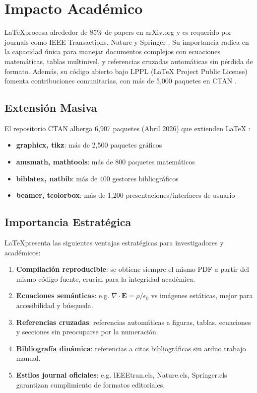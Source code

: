 \section{Impacto Académico}
\LaTeX procesa alrededor de 85\% de papers en arXiv.org y es requerido por journals como IEEE Transactions, Nature y Springer \cite{ieee_requirements,arxiv_stats}. Su importancia radica en la capacidad única para manejar documentos complejos con ecuaciones matemáticas, tablas multinivel, y referencias cruzadas automáticas sin pérdida de formato. Además, su código abierto bajo LPPL (LaTeX Project Public License) fomenta contribuciones comunitarias, con más de 5,000 paquetes en CTAN \cite{ieeetran_doc}.

\subsection{Extensión Masiva}

El repositorio CTAN alberga 6,907 paquetes (Abril 2026) que extienden LaTeX \cite{ctan_stats}:

\begin{itemize}
    \item \textbf{graphicx, tikz}: más de 2,500 paquetes gráficos
    \item \textbf{amsmath, mathtools}: más de 800 paquetes matemáticos
    \item \textbf{biblatex, natbib}: más de 400 gestores bibliográficos
    \item \textbf{beamer, tcolorbox}: más de 1,200 presentaciones/interfaces de usuario
\end{itemize}

\subsection{Importancia Estratégica}

\LaTeX presenta las siguientes ventajas estratégicas para investigadores y académicos:

\begin{enumerate}
    \item \textbf{Compilación reproducible}: se obtiene siempre el mismo PDF a partir del mismo código fuente, crucial para la integridad académica.
    \item \textbf{Ecuaciones semánticas}: e.g. $\nabla\cdot\mathbf{E}=\rho/\epsilon_0$ vs imágenes estáticas, mejor para accesibilidad y búsqueda.
    \item \textbf{Referencias cruzadas}: referencias automáticas a figuras, tablas, ecuaciones y secciones sin preocuparse por la numeración.
    \item \textbf{Bibliografía dinámica}: referencias a citas bibliográficas sin arduo trabajo manual.
    \item \textbf{Estilos journal oficiales}: e.g. IEEEtran.cls, Nature.cls, Springer.cls garantizan cumplimiento de formatos editoriales.
\end{enumerate}